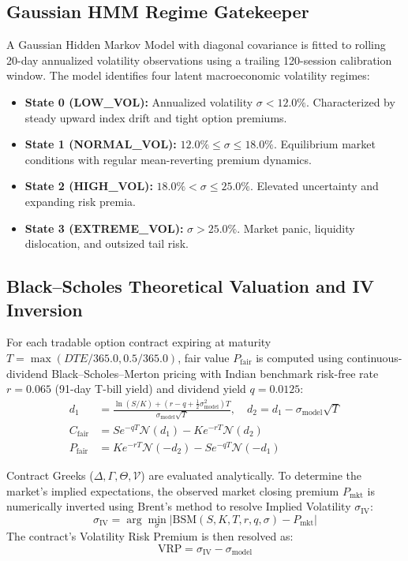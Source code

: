 \documentclass[journal]{IEEEtran}
\begin{document}
\subsection{Gaussian HMM Regime Gatekeeper}
A Gaussian Hidden Markov Model with diagonal covariance is fitted to rolling 20-day annualized volatility observations using a trailing 120-session calibration window. The model identifies four latent macroeconomic volatility regimes:
\begin{itemize}
    \item \textbf{State 0 (LOW\_VOL):} Annualized volatility $\sigma < 12.0\%$. Characterized by steady upward index drift and tight option premiums.
    \item \textbf{State 1 (NORMAL\_VOL):} $12.0\% \le \sigma \le 18.0\%$. Equilibrium market conditions with regular mean-reverting premium dynamics.
    \item \textbf{State 2 (HIGH\_VOL):} $18.0\% < \sigma \le 25.0\%$. Elevated uncertainty and expanding risk premia.
    \item \textbf{State 3 (EXTREME\_VOL):} $\sigma > 25.0\%$. Market panic, liquidity dislocation, and outsized tail risk.
\end{itemize}

\subsection{Black--Scholes Theoretical Valuation and IV Inversion}
For each tradable option contract expiring at maturity $T = \max(DTE/365.0, 0.5/365.0)$, fair value $P_{\mathrm{fair}}$ is computed using continuous-dividend Black--Scholes--Merton pricing with Indian benchmark risk-free rate $r=0.065$ (91-day T-bill yield) and dividend yield $q=0.0125$:
\begin{equation}
\begin{aligned}
d_1 &= \frac{\ln(S/K) + (r - q + \frac{1}{2}\sigma_{\mathrm{model}}^2)T}{\sigma_{\mathrm{model}}\sqrt{T}}, \quad d_2 = d_1 - \sigma_{\mathrm{model}}\sqrt{T} \\
C_{\mathrm{fair}} &= S e^{-q T} \mathcal{N}(d_1) - K e^{-r T} \mathcal{N}(d_2) \\
P_{\mathrm{fair}} &= K e^{-r T} \mathcal{N}(-d_2) - S e^{-q T} \mathcal{N}(-d_1)
\end{aligned}
\end{equation}

Contract Greeks ($\Delta, \Gamma, \Theta, \mathcal{V}$) are evaluated analytically. To determine the market's implied expectations, the observed market closing premium $P_{\mathrm{mkt}}$ is numerically inverted using Brent's method to resolve Implied Volatility $\sigma_{\mathrm{IV}}$:
\begin{equation}
\sigma_{\mathrm{IV}} = \arg\min_{\sigma} \left| \mathrm{BSM}(S, K, T, r, q, \sigma) - P_{\mathrm{mkt}} \right|
\end{equation}
The contract's Volatility Risk Premium is then resolved as:
\begin{equation}
\mathrm{VRP} = \sigma_{\mathrm{IV}} - \sigma_{\mathrm{model}}
\end{equation}
\end{document}
